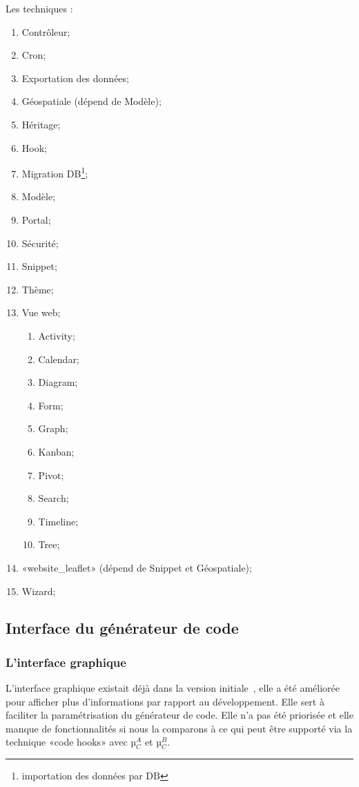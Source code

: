 Les techniques :
\begin{enumerate}
    \item Contrôleur;
    \item Cron;
    \item Exportation des données;
    \item Géospatiale (dépend de Modèle);
    \item Héritage;
    \item Hook;
    \item Migration DB\footnote{importation des données par DB};
    \item Modèle;
    \item Portal;
    \item Sécurité;
    \item Snippet;
    \item Thème;
    \item Vue web;
    \begin{enumerate}
        \item Activity;
        \item Calendar;
        \item Diagram;
        \item Form;
        \item Graph;
        \item Kanban;
        \item Pivot;
        \item Search;
        \item Timeline;
        \item Tree;
    \end{enumerate}
    \item «website\_leaflet» (dépend de Snippet et Géospatiale);
    \item Wizard;
\end{enumerate}

\subsection{Interface du générateur de code}

\subsubsection{L'interface graphique}

 L'interface graphique existait déjà dans la version initiale~\cite{bluiksnot_repo}, elle a été améliorée pour afficher plus d'informations par rapport au développement. Elle sert à faciliter la paramétrisation du générateur de code. Elle n’a pas été priorisée et elle manque de fonctionnalités si nous la comparons à ce qui peut être supporté via la technique «code hooks» avec µ$_C^A$ et µ$_C^B$.

